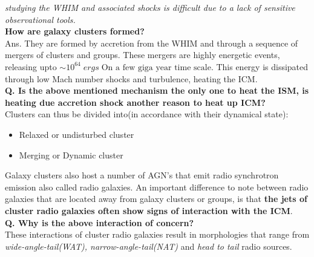 \documentclass[12pt]{report}
\begin{document}
\textit{studying the WHIM and associated shocks is difficult due to a lack of sensitive observational tools.}\\
\textbf{How are galaxy clusters formed?}\\
Ans. They are formed by accretion from the WHIM and through a sequence of mergers of clusters and groups. These mergers are highly energetic events, releasing upto $\sim 10^{64} \; ergs\; \text{On a few giga year time scale}$. This energy is dissipated through low Mach number shocks and turbulence, heating the ICM.\\
\textbf{Q. Is the above mentioned mechanism the only one to heat the ISM, is heating due accretion shock another reason to heat up ICM?}\\
Clusters can thus be divided into(in accordance with their dynamical state):
\begin{itemize}
\item Relaxed or undisturbed cluster
\item Merging or Dynamic cluster
\end{itemize}
Galaxy clusters also host a number of AGN's that emit radio synchrotron emission also called radio galaxies. An important difference to note between radio galaxies that are located away from galaxy clusters or groups, is that \textbf{ the jets of cluster radio galaxies often show signs of interaction with the ICM}.\\
\textbf{Q. Why is the above interaction of concern?}\\
These interactions of cluster radio galaxies result in morphologies that range from \textit{wide-angle-tail(WAT), narrow-angle-tail(NAT)} and \textit{head to tail} radio sources.
\end{document}
